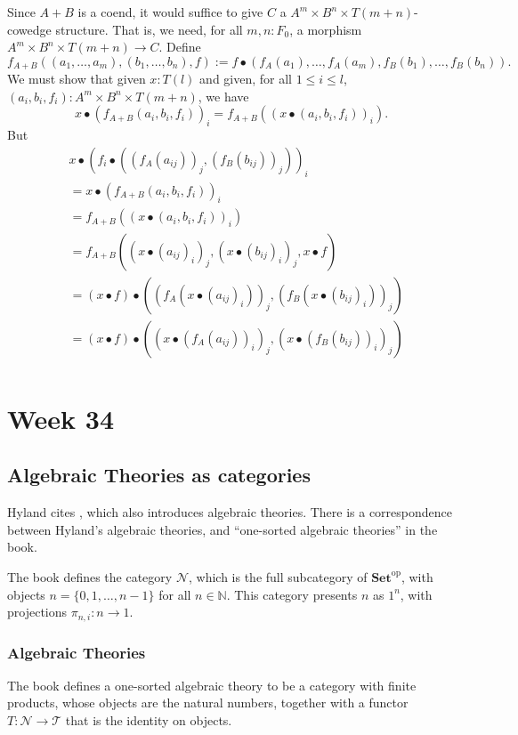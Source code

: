 \documentclass{amsbook}
\newcommand{\Catb}[1]{\mathbf{#1}}
\newcommand{\SET}{\Catb{Set}}
\newcommand{\Ob}[1]{{#1}_0}
\newcommand{\op}[1]{\ensuremath{{#1}^\text{op}}}
\theoremstyle{definition}
\begin{document}
  Since $ A + B $ is a coend, it would suffice to give $ C $ a $ A^m \times B^n \times T(m + n) $-cowedge structure. That is, we need, for all $ m, n: \Ob F $, a morphism $ A^m \times B^n \times T(m + n) \to C $. Define
  \[ f_{A + B}((a_1, \dots, a_m), (b_1, \dots, b_n), f) := f \bullet (f_A(a_1), \dots, f_A(a_m), f_B(b_1), \dots, f_B(b_n)). \]
  We must show that given $ x: T(l) $ and given, for all $ 1 \leq i \leq l $, $ (a_i, b_i, f_i) : A^m \times B^n \times T(m + n) $, we have
  \[ x \bullet (f_{A + B}(a_i, b_i, f_i))_i = f_{A + B}((x \bullet (a_i, b_i, f_i))_i). \]
  But
  \begin{align*}
    &x \bullet (f_i \bullet ((f_A(a_{ij}))_j, (f_B(b_{ij}))_j))_i\\
    &=x \bullet (f_{A + B}(a_i, b_i, f_i))_i\\
    &= f_{A + B}((x \bullet (a_i, b_i, f_i))_i)\\
    &= f_{A + B}((x \bullet (a_{ij})_i)_j, (x \bullet (b_{ij})_i)_j, x \bullet f)\\
    &= (x \bullet f) \bullet ((f_A(x \bullet (a_{ij})_i))_j, (f_B(x \bullet (b_{ij})_i))_j)\\
    &= (x \bullet f) \bullet ((x \bullet (f_A(a_{ij}))_i)_j, (x \bullet (f_B(b_{ij}))_i)_j)\\
  \end{align*}

  \chapter*{Week 34}
  \section{Algebraic Theories as categories}
  Hyland cites \cite{p13-adamek-rosicky}, which also introduces algebraic theories. There is a correspondence between Hyland's algebraic theories, and ``one-sorted algebraic theories'' in the book.

  The book defines the category $ \mathcal N $, which is the full subcategory of $ \op \SET $, with objects $ n = \{ 0, 1, \dots, n - 1 \} $ for all $ n \in \mathbb N $. This category presents $ n $ as $ 1^n $, with projections $ \pi_{n, i} : n \to 1 $.

  \subsection{Algebraic Theories}
  The book defines a one-sorted algebraic theory to be a category with finite products, whose objects are the natural numbers, together with a functor $ T : \mathcal N \to \mathcal T $ that is the identity on objects.
\end{document}
